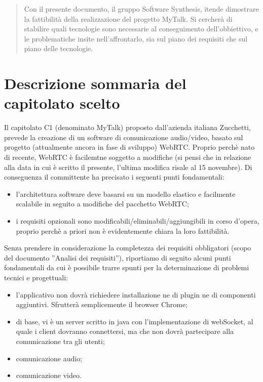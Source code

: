 \begin{abstract}
Con il presente documento, il gruppo Software Synthesis, itende dimostrare la fattibilità della realizzazione del progetto MyTalk. Si cercherà di stabilire quali tecnologie sono necessarie al conseguimento dell'obbiettivo, e le problematiche insite nell'affrontarlo, sia sul piano dei requisiti che sul piano delle tecnologie.
\end{abstract}
\newpage

\section{Descrizione sommaria del capitolato scelto}
Il capitolato C1 (denominato MyTalk) proposto dall'azienda italiana Zucchetti, prevede la creazione di un software di comunicazione audio/video, basato sul progetto (attualmente ancora in fase di sviluppo) WebRTC. Proprio perchè nato di recente, WebRTC è facilemtne soggetto a modifiche (si pensi che in relazione alla data in cui è scritto il presente, l'ultima modifica risale al 15 novembre). Di conseguenza il committente ha precisato i seguenti punti fondamentali:

\begin{itemize}
	\item l'architettura software deve basarsi su un modello elastico e facilmente scalabile in seguito a modifiche del pacchetto WebRTC;
	\item i requisiti opzionali sono modificabili/eliminabili/aggiungibili in corso d'opera, proprio perchè a priori non è evidentemente chiara la loro fattibilità.
\end{itemize}

Senza prendere in considerazione la completezza dei requisiti obbligatori (scopo del documento ''Analisi dei requisiti''), riportiamo di seguito alcuni punti fondamentali da cui è possibile trarre spunti per la determinazione di problemi tecnici e progettuali:

\begin{itemize}
	\item l'applicativo non dovrà richiedere installazione ne di plugin ne di componenti aggiuntivi. Sfrutterà semplicemente il browser Chrome;
	\item di base, vi è un server scritto in java con l'implementazione di webSocket, al quale i client dovranno connettersi, ma che non dovrà partecipare alla comunicazione tra gli utenti;
	\item comunicazione audio;
	\item comunicazione video.
\end{itemize}


